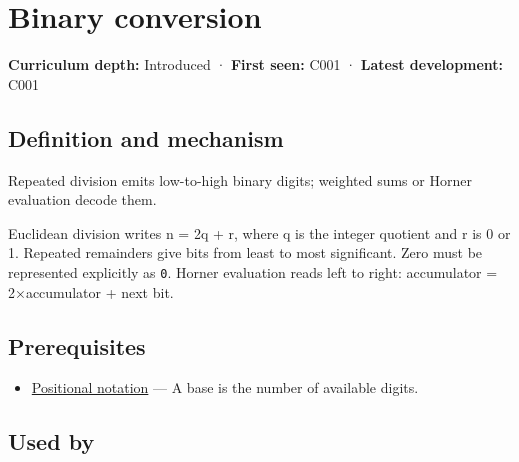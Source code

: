 \hypertarget{appendix-dc552784a2c0}{}\label{referencestart:appendix-dc552784a2c0}
\section{Binary conversion}\label{appendix-dc552784a2c0-binary-conversion}

\hypertarget{appendix-dc552784a2c0-binary-conversion}{}

\textbf{Curriculum depth:} Introduced · \textbf{First seen:} C001 · \textbf{Latest development:} C001

\begin{allmightroledefinition}

\subsection{Definition and mechanism}\label{appendix-dc552784a2c0-definition-and-mechanism}

\hypertarget{appendix-dc552784a2c0-definition-and-mechanism}{}

Repeated division emits low-to-high binary digits; weighted sums or Horner evaluation decode them.

\end{allmightroledefinition}

Euclidean division writes n = 2q + r, where q is the integer quotient and r is 0 or 1. Repeated remainders give bits from least to most significant. Zero must be represented explicitly as \texttt{0}. Horner evaluation reads left to right: accumulator = 2×accumulator + next bit.

\subsection{Prerequisites}\label{appendix-dc552784a2c0-prerequisites}

\hypertarget{appendix-dc552784a2c0-prerequisites}{}

\begin{itemize}
\tightlist
\item
  \hyperref[appendix-83c3f28f7bda]{Positional notation} --- A base is the number of available digits.
\end{itemize}

\subsection{Used by}\label{appendix-dc552784a2c0-used-by}

